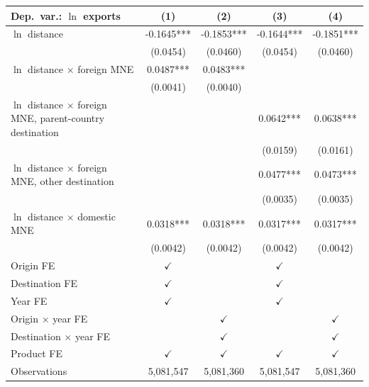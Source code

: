 \begin{tabular}{lcccc} \hline
Dep.\ var.: $\ln$ exports & (1) & (2) & (3) & (4) \\ \hline
$\ln$ distance & -0.1645*** & -0.1853*** & -0.1644*** & -0.1851*** \\
 & (0.0454) & (0.0460) & (0.0454) & (0.0460) \\
$\ln$ distance $\times$ foreign MNE & 0.0487*** & 0.0483*** &  &  \\
 & (0.0041) & (0.0040) &  &  \\
$\ln$ distance $\times$ foreign MNE, parent-country destination &  &  & 0.0642*** & 0.0638*** \\
 &  &  & (0.0159) & (0.0161) \\
$\ln$ distance $\times$ foreign MNE, other destination &  &  & 0.0477*** & 0.0473*** \\
 &  &  & (0.0035) & (0.0035) \\
$\ln$ distance $\times$ domestic MNE & 0.0318*** & 0.0318*** & 0.0317*** & 0.0317*** \\
 & (0.0042) & (0.0042) & (0.0042) & (0.0042) \\
\hline
Origin FE & $\checkmark$ &  & $\checkmark$ &  \\
Destination FE & $\checkmark$ &  & $\checkmark$ &  \\
Year FE & $\checkmark$ &  & $\checkmark$ &  \\
Origin $\times$ year FE &  & $\checkmark$ &  & $\checkmark$ \\
Destination $\times$ year FE &  & $\checkmark$ &  & $\checkmark$ \\
Product FE & $\checkmark$ & $\checkmark$ & $\checkmark$ & $\checkmark$ \\
\hline
Observations & 5,081,547 & 5,081,360 & 5,081,547 & 5,081,360 \\
\hline
\end{tabular}
